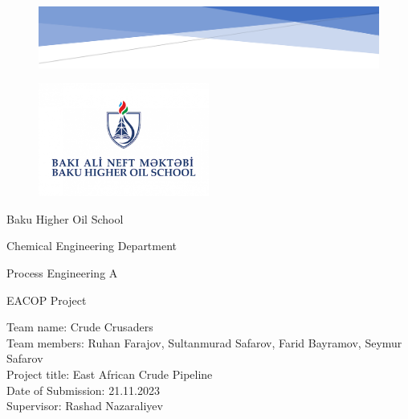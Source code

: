 \documentclass[12pt]{article}
\begin{document}
	\begin{figure}[h!]
		\centering
		\includegraphics[width=1\textwidth]{assets/images/header.png}
		
	 \end{figure}

     \begin{figure}[H]
        \raggedleft
        \includegraphics[width=0.5\textwidth]{assets/images/banm.png}
      \end{figure}

      \begin{center}
        {\fontsize{20pt}{20pt}\selectfont 

        \vspace{10mm}
            Baku Higher Oil School

            Chemical Engineering Department

            Process Engineering A

            EACOP Project
        }
      \end{center}
      \begin{center}
        {\fontsize{14pt}{14pt}
        \raggedright
        \vspace{30mm}
            Team name: Crude Crusaders \\

            Team members: Ruhan Farajov, Sultanmurad Safarov, Farid Bayramov, Seymur Safarov \\

            Project title: East African Crude Pipeline \\

            Date of Submission: 21.11.2023 \\

            Supervisor: Rashad Nazaraliyev \\

            
        }
      \end{center}
\end{document}
